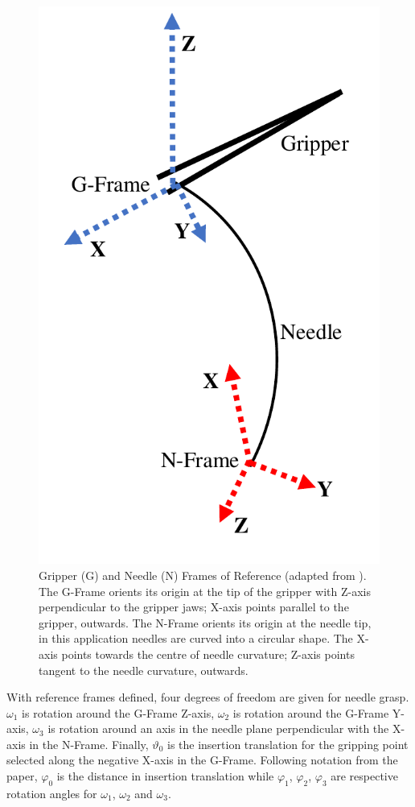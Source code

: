 \documentclass[english]{sobraep}
\begin{document}
\begin{figure}
    \centering
    \includegraphics[scale=0.4]{figs/needle-frames.pdf}
    \caption{Gripper (G) and Needle (N) Frames of Reference (adapted from \cite[Figure 2(a)]{needle-grasp}). The G-Frame orients its origin at the tip of the gripper with Z-axis perpendicular to the gripper jaws; X-axis points parallel to the gripper, outwards. The N-Frame orients its origin at the needle tip, in this application needles are curved into a circular shape. The X-axis points towards the centre of needle curvature; Z-axis points tangent to the needle curvature, outwards.}
    \label{fig:needle-frames}
\end{figure}
\par{With reference frames defined, four degrees of freedom are given for needle grasp. $\omega_{1}$ is rotation around the G-Frame Z-axis, $\omega_{2}$ is rotation around the G-Frame Y-axis, $\omega_{3}$ is rotation around an axis in the needle plane perpendicular with the X-axis in the N-Frame. Finally, $\vartheta_{0}$ is the insertion translation for the gripping point selected along the negative X-axis in the G-Frame. Following notation from the paper, $\varphi_0$ is the distance in insertion translation while $\varphi_1$, $\varphi_2$, $\varphi_3$ are respective rotation angles for $\omega_{1}$, $\omega_{2}$ and $\omega_{3}$.}
\end{document}
